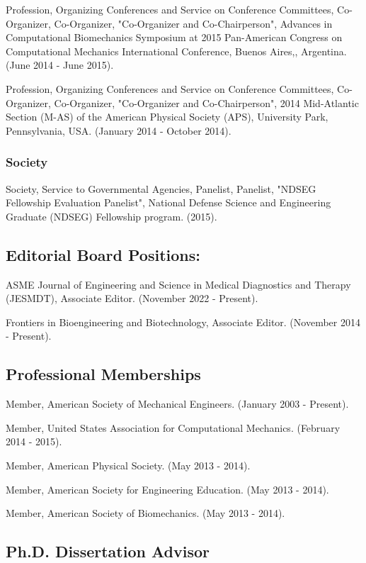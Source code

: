 \documentclass[
]{article}
\begin{document}
Profession, Organizing Conferences and Service on Conference Committees,
Co-Organizer, Co-Organizer, "Co-Organizer and Co-Chairperson", Advances
in Computational Biomechanics Symposium at 2015 Pan-American Congress on
Computational Mechanics International Conference, Buenos Aires,,
Argentina. (June 2014 - June 2015).

Profession, Organizing Conferences and Service on Conference Committees,
Co-Organizer, Co-Organizer, "Co-Organizer and Co-Chairperson", 2014
Mid-Atlantic Section (M-AS) of the American Physical Society (APS),
University Park, Pennsylvania, USA. (January 2014 - October 2014).

\subsubsection{Society}\label{society}

Society, Service to Governmental Agencies, Panelist, Panelist, "NDSEG
Fellowship Evaluation Panelist", National Defense Science and
Engineering Graduate (NDSEG) Fellowship program. (2015).

\subsection{Editorial Board Positions:}\label{editorial-board-positions}

ASME Journal of Engineering and Science in Medical Diagnostics and
Therapy (JESMDT), Associate Editor. (November 2022 - Present).

Frontiers in Bioengineering and Biotechnology, Associate Editor.
(November 2014 - Present).

\subsection{Professional Memberships}\label{professional-memberships}

Member, American Society of Mechanical Engineers. (January 2003 -
Present).

Member, United States Association for Computational Mechanics. (February
2014 - 2015).

Member, American Physical Society. (May 2013 - 2014).

Member, American Society for Engineering Education. (May 2013 - 2014).

Member, American Society of Biomechanics. (May 2013 - 2014).



\subsection{Ph.D. Dissertation Advisor}\label{phd-dissertation-advisor}
\end{document}
